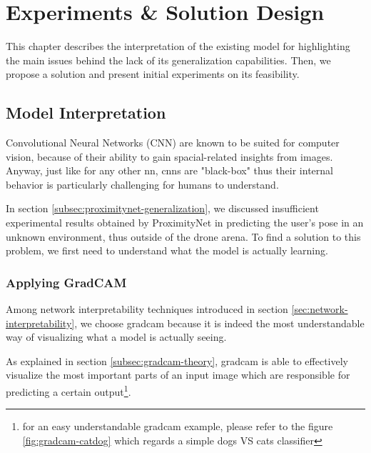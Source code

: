 \chapter{Experiments \& Solution Design}
\label{chap:design}


This chapter describes the interpretation of the existing model for highlighting the main issues behind the lack of its generalization capabilities. Then, we propose a solution and present initial experiments on its feasibility.




\section{Model Interpretation}
\label{sec:model-interpretration}


Convolutional Neural Networks (CNN) are known to be suited for computer vision, because of their ability to gain spacial-related insights from images. Anyway, just like for any other \gls{nn}, \gls{cnn}s are "black-box" thus their internal behavior is particularly challenging for humans to understand.

In section \ref{subsec:proximitynet-generalization}, we discussed insufficient experimental results obtained by ProximityNet in predicting the user's pose in an unknown environment, thus outside of the drone arena. To find a solution to this problem, we first need to understand what the model is actually learning.



\subsection{Applying GradCAM}
\label{subsec:gradcam-apply}


Among network interpretability techniques introduced in section \ref{sec:network-interpretability}, we choose \gls{gradcam} because it is indeed the most understandable way of visualizing what a model is actually seeing.

As explained in section \ref{subsec:gradcam-theory}, \gls{gradcam} is able to effectively visualize the most important parts of an input image which are responsible for predicting a certain output\footnote{for an easy understandable \gls{gradcam} example, please refer to the figure \ref{fig:gradcam-catdog} which regards a simple dogs VS cats classifier}.



